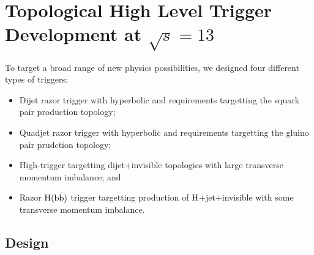 \chapter{Topological High Level Trigger Development at $\sqrt{s}=13$\TeV}
\label{ch:hlt13TeV}

To target a broad range of new physics possibilities, we designed four different
types of triggers:
\begin{itemize}
\item Dijet razor trigger with hyperbolic \MR and \Rtwo requirements targetting the squark pair production topology;
\item Quadjet razor trigger with hyperbolic \MR and \Rtwo requirements targetting the gluino pair
  prudction topology;
\item High-\Rtwo trigger targetting dijet+invisible topologies with
  large transverse momentum imbalance; and
\item Razor $\mathrm{H}(\mathrm{b}\bar{\mathrm{b}})$ trigger targetting production of
  $\mathrm{H}$+jet+invisible with some transverse momentum imbalance.
\end{itemize}

\section{Design}


